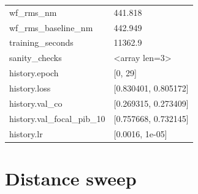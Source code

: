 \begin{longtable}{p{}p{}}
wf\_rms\_nm & 441.818\\
wf\_rms\_baseline\_nm & 442.949\\
training\_seconds & 11362.9\\
sanity\_checks & <array len=3>\\
history.epoch & [0, 29]\\
history.loss & [0.830401, 0.805172]\\
history.val\_co & [0.269315, 0.273409]\\
history.val\_focal\_pib\_10 & [0.757668, 0.732145]\\
history.lr & [0.0016, 1e-05]\\
\end{longtable}

\section{Distance sweep}
